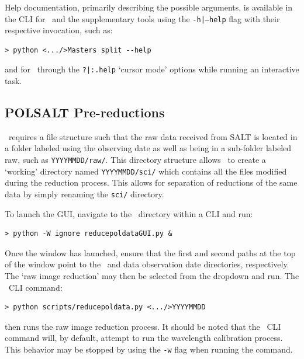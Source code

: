 Help documentation, primarily describing the possible arguments, is available in the \gls{CLI} for \polsalt\ and the supplementary tools using the \texttt{-h|--help} flag with their respective invocation, such as:

\begin{verbatim}> python <.../>Masters split --help\end{verbatim}

\noindent and for \iraf\ through the \texttt{?|:.help} `cursor mode' options while running an interactive task.


\subsection{POLSALT Pre-reductions}\label{subsec:reduc_pre}

\polsalt\ requires a file structure such that the raw data received from \gls{SALT} is located in a folder labeled using the observing date as well as being in a sub-folder labeled raw, such as \texttt{YYYYMMDD/raw/}. This directory structure allows \polsalt\ to create a `working' directory named \texttt{YYYYMMDD/sci/} which contains all the files modified during the reduction process. This allows for separation of reductions of the same data by simply renaming the \texttt{sci/} directory.
\prgph

To launch the \gls{GUI}, navigate to the \polsalt\ directory within a \gls{CLI} and run:

\begin{verbatim}> python -W ignore reducepoldataGUI.py &\end{verbatim}

\noindent Once the window has launched, ensure that the first and second paths at the top of the window point to the \polsalt\ and data observation date directories, respectively. The `raw image reduction' may then be selected from the dropdown and run. The \polsalt\ \gls{CLI} command:

\begin{verbatim}> python scripts/reducepoldata.py <.../>YYYYMMDD\end{verbatim}

\noindent then runs the raw image reduction process. It should be noted that the \polsalt\ \gls{CLI} command will, by default, attempt to run the wavelength calibration process. This behavior may be stopped by using the \texttt{-w} flag when running the command.
\prgph



